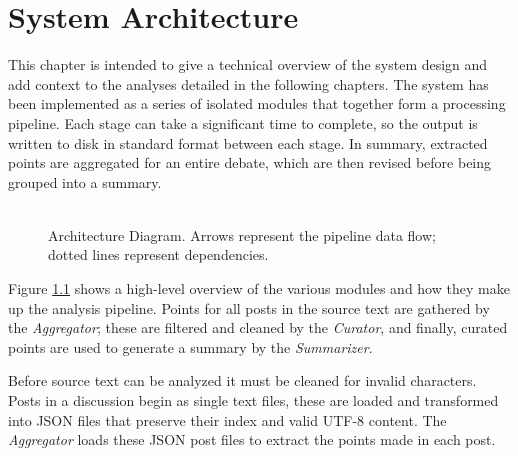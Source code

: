 \chapter{System Architecture\label{chap:system-architecture}}
  This chapter is intended to give a technical overview of the system design and add context to the analyses detailed in the following chapters. The system has been implemented as a series of isolated modules that together form a processing pipeline. Each stage can take a significant time to complete, so the output is written to disk in standard format between each stage. In summary, extracted points are aggregated for an entire debate, which are then revised before being grouped into a summary.

  \begin{figure}[!h]
    \centering
    \caption{\\Architecture Diagram. Arrows represent the pipeline data flow; dotted lines represent dependencies.}
    \label{fig:arch-dia}
  \end{figure}

  Figure \ref{fig:arch-dia} shows a high-level overview of the various modules and how they make up the analysis pipeline. Points for all posts in the source text are gathered by the \textit{Aggregator}; these are filtered and cleaned by the \textit{Curator}, and finally, curated points are used to generate a summary by the \textit{Summarizer}.

  Before source text can be analyzed it must be cleaned for invalid characters. Posts in a discussion begin as single text files, these are loaded and transformed into JSON files that preserve their index and valid UTF-8 content. The \textit{Aggregator} loads these JSON post files to extract the points made in each post.

